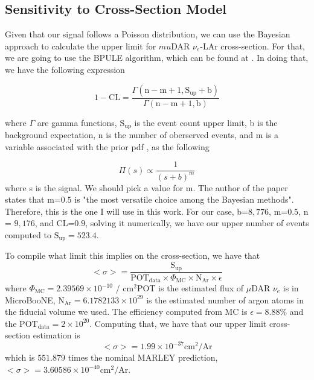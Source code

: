 \clearpage
\subsection{Sensitivity to Cross-Section Model}
Given that our signal follows a Poisson distribution, we can use the Bayesian approach to calculate the upper limit for $mu$DAR $\nu_e$-LAr cross-section. For that, we are going to use the BPULE algorithm, which can be found at \cite{BPULE}. 
In doing that, we have the following expression

\begin{equation}
    1-\textrm{CL} =\frac{\Gamma(\textrm{n}-\textrm{m}+1, \textrm{S}_{\textrm{up}}+\textrm{b})}{\Gamma(\textrm{n}-\textrm{m}+1,\textrm{b})}
\end{equation}

where $\Gamma$ are gamma functions, $\textrm{S}_{\textrm{up}}$ is the event count upper limit, b is 
the background expectation, n is the number of oberserved events, and m is a variable associated with the prior pdf , as the following

\begin{equation}
    \Pi(s) \propto \frac{1}{(s + b)^m}
\end{equation}
where s is the signal. We should pick a value for m. The author of the paper states that m=$0.5$ is "the most versatile choice among the Bayesian methods". Therefore, this is the one I will use in this work.  
For our case, b=$8,776$, m=$0.5$, n = $9,176$, and CL=$0.9$, solving it numerically, we have our upper number of events computed to $\textrm{S}_{\textrm{up}}=523.4$.

To compile what limit this implies on the cross-section, we have that
\begin{equation}
    <\sigma> = \frac{\textrm{S}_{\textrm{up}}}{\textrm{POT}_\textrm{data}\times\Phi_{\textrm{MC}}\times\textrm{N}_\textrm{Ar}\times \epsilon}
\end{equation}
where $\Phi_{\textrm{MC}} = 2.39569\times 10^{-10}$ / cm$^2$POT is the estimated flux of $\mu$DAR $\nu_e$ is in MicroBooNE, $\textrm{N}_\textrm{Ar} = 6.1782133\times 10^{29}$ is the estimated number of argon atoms in the fiducial volume we used. The efficiency computed from MC is $\epsilon=8.88\%$ and the $\textrm{POT}_\textrm{data} = 2\times 10^{20}$. Computing that, we have that our upper limit cross-section estimation is 
\begin{equation}
    <\sigma> = 1.99\times10^{-37} \textrm{cm}^2 / \textrm{Ar}
\end{equation}
which is $551.879$ times the nominal MARLEY prediction,  $<\sigma> = 3.60586\times 10^{-40} \textrm{cm}^2 / \textrm{Ar}$.
